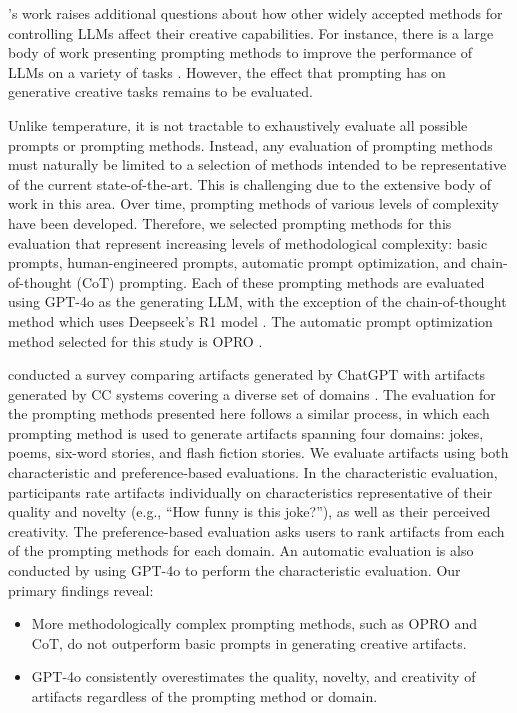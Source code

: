 \documentclass[phd,electronic,oneside,twosidetoc,letterpaper,chaptercenter,parttop,lof]{byumsphd}
\begin{document}
\citeauthor{peeperkorn2024temperature}'s work raises additional questions about how other widely accepted methods for controlling LLMs affect their creative capabilities. For instance, there is a large body of work presenting prompting methods to improve the performance of LLMs on a variety of tasks \cite{brown2020gpt3,liu2023prompt}. However, the effect that prompting has on generative creative tasks remains to be evaluated. 

Unlike temperature, it is not tractable to exhaustively evaluate all possible prompts or prompting methods. Instead, any evaluation of prompting methods must naturally be limited to a selection of methods intended to be representative of the current state-of-the-art. This is challenging due to the extensive body of work in this area. Over time, prompting methods of various levels of complexity have been developed. Therefore, we selected prompting methods for this evaluation that represent increasing levels of methodological complexity: basic prompts, human-engineered prompts, automatic prompt optimization, and chain-of-thought (CoT) prompting. Each of these prompting methods are evaluated using GPT-4o \cite{gpt-4o} as the generating LLM, with the exception of the chain-of-thought method which uses Deepseek’s R1 model \cite{deepseek2025r1}. The automatic prompt optimization method selected for this study is OPRO \cite{yang2024opro}.

\citeauthor{morain2023language} conducted a survey comparing artifacts generated by ChatGPT with artifacts generated by CC systems covering a diverse set of domains \cite{morain2023language}. The evaluation for the prompting methods presented here follows a similar process, in which each prompting method is used to generate artifacts spanning four domains: jokes, poems, six-word stories, and flash fiction stories. We evaluate artifacts using both characteristic and preference-based evaluations. In the characteristic evaluation, participants rate artifacts individually on characteristics representative of their quality and novelty (e.g., “How funny is this joke?”), as well as their perceived creativity. The preference-based evaluation asks users to rank artifacts from each of the prompting methods for each domain. An automatic evaluation is also conducted by using GPT-4o to perform the characteristic evaluation. Our primary findings reveal:

\begin{itemize}
    \item More methodologically complex prompting methods, such as OPRO and CoT, do not outperform basic prompts in generating creative artifacts.
    \item GPT-4o consistently overestimates the quality, novelty, and creativity of artifacts regardless of the prompting method or domain.
\end{itemize}
\end{document}
